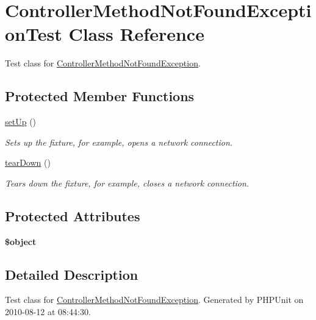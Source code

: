 \hypertarget{class_controller_method_not_found_exception_test}{
\section{ControllerMethodNotFoundExceptionTest Class Reference}
\label{class_controller_method_not_found_exception_test}
}


Test class for \hyperlink{class_controller_method_not_found_exception}{ControllerMethodNotFoundException}.  


\subsection*{Protected Member Functions}
\begin{DoxyCompactItemize}
\item 
\hyperlink{class_controller_method_not_found_exception_test_acf80544b5d182cfd95ea5331d89d1f89}{setUp} ()
\begin{DoxyCompactList}\small\item\em Sets up the fixture, for example, opens a network connection. \item\end{DoxyCompactList}\item 
\hyperlink{class_controller_method_not_found_exception_test_af52e4e1706bd65d9af5de67a5dcd8b20}{tearDown} ()
\begin{DoxyCompactList}\small\item\em Tears down the fixture, for example, closes a network connection. \item\end{DoxyCompactList}\end{DoxyCompactItemize}
\subsection*{Protected Attributes}
\begin{DoxyCompactItemize}
\item 
\hypertarget{class_controller_method_not_found_exception_test_a62c0bc56faa771eda8c293548b118fcd}{
{\bfseries \$object}}
\label{class_controller_method_not_found_exception_test_a62c0bc56faa771eda8c293548b118fcd}

\end{DoxyCompactItemize}


\subsection{Detailed Description}
Test class for \hyperlink{class_controller_method_not_found_exception}{ControllerMethodNotFoundException}. Generated by PHPUnit on 2010-\/08-\/12 at 08:44:30. 

